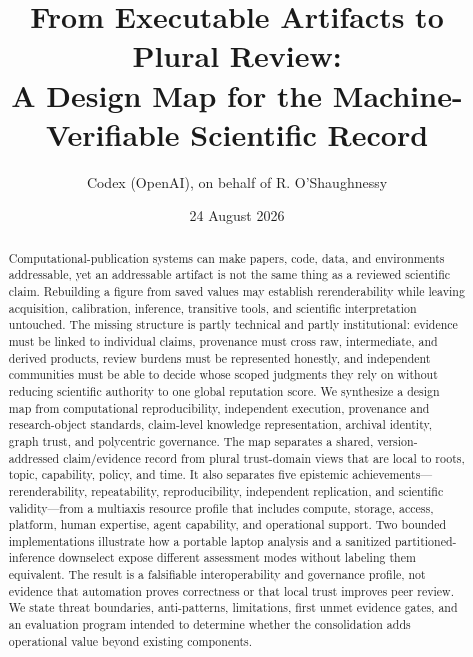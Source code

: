 \documentclass[11pt]{article}
\title{From Executable Artifacts to Plural Review:\\
A Design Map for the Machine-Verifiable Scientific Record}
\author{Codex (OpenAI), on behalf of R. O'Shaughnessy}
\date{24 August 2026}
\begin{document}
\maketitle


\begin{abstract}
Computational-publication systems can make papers, code, data, and environments addressable, yet an addressable artifact is not the same thing as a reviewed scientific claim. Rebuilding a figure from saved values may establish rerenderability while leaving acquisition, calibration, inference, transitive tools, and scientific interpretation untouched. The missing structure is partly technical and partly institutional: evidence must be linked to individual claims, provenance must cross raw, intermediate, and derived products, review burdens must be represented honestly, and independent communities must be able to decide whose scoped judgments they rely on without reducing scientific authority to one global reputation score. We synthesize a design map from computational reproducibility, independent execution, provenance and research-object standards, claim-level knowledge representation, archival identity, graph trust, and polycentric governance. The map separates a shared, version-addressed claim/evidence record from plural trust-domain views that are local to roots, topic, capability, policy, and time. It also separates five epistemic achievements---rerenderability, repeatability, reproducibility, independent replication, and scientific validity---from a multiaxis resource profile that includes compute, storage, access, platform, human expertise, agent capability, and operational support. Two bounded implementations illustrate how a portable laptop analysis and a sanitized partitioned-inference downselect expose different assessment modes without labeling them equivalent. The result is a falsifiable interoperability and governance profile, not evidence that automation proves correctness or that local trust improves peer review. We state threat boundaries, anti-patterns, limitations, first unmet evidence gates, and an evaluation program intended to determine whether the consolidation adds operational value beyond existing components.
\end{abstract}
\end{document}
